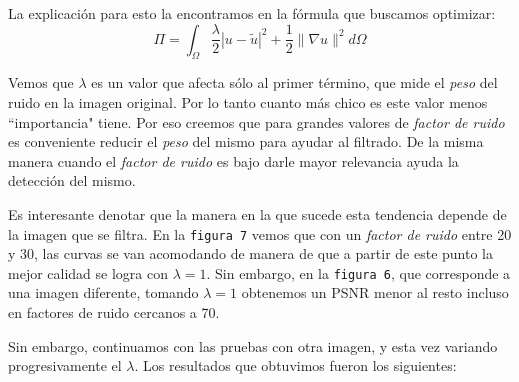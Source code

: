 \documentclass[a4paper]{article}
\begin{document}
La explicación para esto la encontramos en la fórmula que buscamos optimizar:
$$  \Pi = \int_\Omega {\frac{\lambda}{2} \left| u - \tilde{u} \right|^2 + \frac{1}{2} \lVert \nabla u \rVert^2 } d\Omega$$

Vemos que $\lambda$ es un valor que afecta sólo al primer término, que mide el \textit{peso} del ruido en la imagen original. Por lo tanto cuanto más chico es este valor menos ``importancia" tiene. Por eso creemos que para grandes valores de \textit{factor de ruido} es conveniente reducir el \textit{peso} del mismo para ayudar al filtrado. De la misma manera cuando el \textit{factor de ruido} es bajo darle mayor relevancia ayuda la detección del mismo.

Es interesante denotar que la manera en la que sucede esta tendencia depende de la imagen que se filtra. En la \texttt{figura 7} vemos que con un \textit{factor de ruido} entre 20 y 30, las curvas se van acomodando de manera de que a partir de este punto la mejor calidad se logra con $\lambda = 1$. Sin embargo, en la \texttt{figura 6}, que corresponde a una imagen diferente, tomando $\lambda = 1$ obtenemos un PSNR menor al resto incluso en factores de ruido cercanos a 70.

Sin embargo, continuamos con las pruebas con otra imagen, y esta vez variando progresivamente el $\lambda$. Los resultados que obtuvimos fueron los siguientes: 
\end{document}
